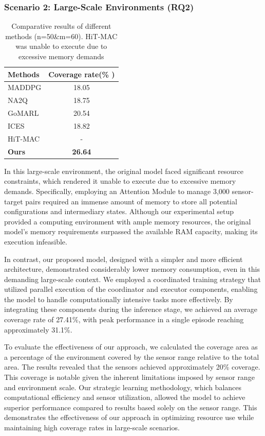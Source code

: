 \documentclass[preprint,12pt]{elsarticle}
\begin{document}
\subsubsection{Scenario 2: Large-Scale Environments (RQ2)}
\begin{table}[ht]
\centering

\begin{tabular}{lc} %
\hline
\textbf{Methods} & \textbf{Coverage rate(\% ) } \\
\hline
MADDPG & 18.05 \\
NA2Q & 18.75 \\
GoMARL   & 20.54 \\
ICES   & 18.82 \\
HiT-MAC   & - \\
\hline
\textbf{Ours} & \textbf{26.64} \\
\hline
\end{tabular}
\caption{Comparative results of different methods (n=50\&m=60). HiT-MAC was  unable to execute due to excessive memory demands}
\end{table}


In this large-scale environment, the original model faced significant resource constraints, which rendered it unable to execute due to excessive memory demands. Specifically, employing an Attention Module to manage 3,000 sensor-target pairs required an immense amount of memory to store all potential configurations and intermediary states. Although our experimental setup provided a computing environment with ample memory resources, the original model's memory requirements surpassed the available RAM capacity, making its execution infeasible.

In contrast, our proposed model, designed with a simpler and more efficient architecture, demonstrated considerably lower memory consumption, even in this demanding large-scale context. We employed a coordinated training strategy that utilized parallel execution of the coordinator and executor components, enabling the model to handle computationally intensive tasks more effectively. By integrating these components during the inference stage, we achieved an average coverage rate of 27.41\%, with peak performance in a single episode reaching approximately 31.1\%.

To evaluate the effectiveness of our approach, we calculated the coverage area as a percentage of the environment covered by the sensor range relative to the total area. The results revealed that the sensors achieved approximately 20\% coverage. This coverage is notable given the inherent limitations imposed by sensor range and environment scale. Our strategic learning methodology, which balances computational efficiency and sensor utilization, allowed the model to achieve superior performance compared to results based solely on the sensor range. This demonstrates the effectiveness of our approach in optimizing resource use while maintaining high coverage rates in large-scale scenarios.
\end{document}
